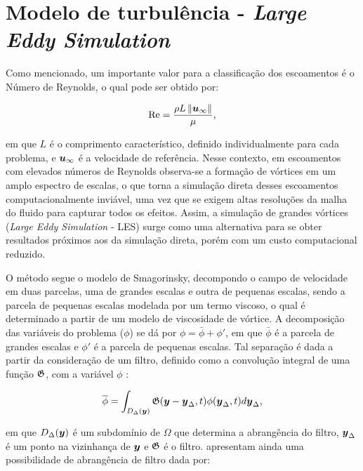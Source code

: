\section{Modelo de turbulência - \textit{Large Eddy Simulation}} \label{LES}

Como mencionado, um importante valor para a classificação dos escoamentos é o Número de Reynolds, o qual pode ser obtido por:

\begin{equation}
    \mathrm{Re}=\frac{\rho L\left\lVert{\boldsymbol{u}_\infty}\right\lVert}{\mu}\text{,}
    \label{eq:Reynolds}
\end{equation}

\noindent em que $L$ é o comprimento característico, definido individualmente para cada problema, e $\boldsymbol{u}_\infty$ é a velocidade de referência. Nesse contexto, em escoamentos com elevados números de Reynolds observa-se a formação de vórtices em um amplo espectro de escalas, o que torna a simulação direta desses escoamentos computacionalmente inviável, uma vez que se exigem altas resoluções da malha do fluido para capturar todos os efeitos. Assim, a simulação de grandes vórtices (\textit{Large Eddy Simulation} - LES) surge como uma alternativa para se obter resultados próximos aos da simulação direta, porém com um custo computacional reduzido.

O método segue o modelo de Smagorinsky, decompondo o campo de velocidade em duas parcelas, uma de grandes escalas e outra de pequenas escalas, sendo a parcela de pequenas escalas modelada por um termo viscoso, o qual é determinado a partir de um modelo de viscosidade de vórtice. A decomposição das variáveis do problema ($\phi$) se dá por $\phi=\bar{\phi}+\phi'$, em que $\bar{\phi}$ é a parcela de grandes escalas e $\phi'$ é a parcela de pequenas escalas. Tal separação é dada a partir da consideração de um filtro, definido como a convolução integral de uma função $\mathfrak{G}$, com a variável $\phi$ \cite{germano1991dynamic,hughes2000large,moeng2015large,katopodes2019free}:

\begin{equation}
    \overline{\phi}=\int_{D_\Delta(\boldsymbol{y})}{\mathfrak{G}(\boldsymbol{y}-\boldsymbol{y}_\Delta,t)\phi(\boldsymbol{y}_\Delta,t)d\boldsymbol{y}_\Delta}\text{,}
\end{equation}

\noindent em que $D_\Delta(\boldsymbol{y})$ é um subdomínio de $\Omega$ que determina a abrangência do filtro, $\boldsymbol{y}_\Delta$ é um ponto na vizinhança de $\boldsymbol{y}$ e $\mathfrak{G}$ é o filtro.  apresentam ainda uma possibilidade de abrangência de filtro dada por:


